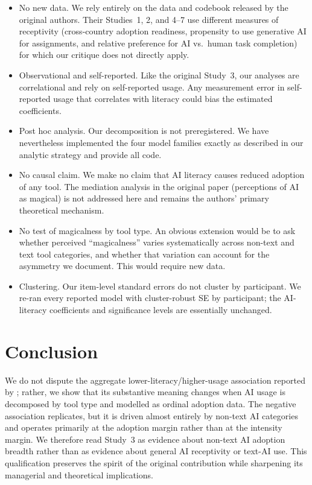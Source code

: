 \documentclass[11pt]{article}
\begin{document}
\begin{itemize}
  \item No new data. We rely entirely on the data and codebook released
    by the original authors. Their Studies~1, 2, and 4--7 use different
    measures of receptivity (cross-country adoption readiness, propensity
    to use generative AI for assignments, and relative preference for AI
    vs.\ human task completion) for which our critique does not directly
    apply.
  \item Observational and self-reported. Like the original Study~3,
    our analyses are correlational and rely on self-reported usage. Any
    measurement error in self-reported usage that correlates with literacy
    could bias the estimated coefficients.
  \item Post hoc analysis. Our decomposition is not preregistered.
    We have nevertheless implemented the four model families exactly as
    described in our analytic strategy and provide all code.
  \item No causal claim. We make no claim that AI literacy
    causes reduced adoption of any tool. The mediation analysis in
    the original paper (perceptions of AI as magical) is not addressed here
    and remains the authors' primary theoretical mechanism.
  \item No test of magicalness by tool type. An obvious extension
    would be to ask whether perceived ``magicalness'' varies systematically
    across non-text and text tool categories, and whether that variation
    can account for the asymmetry we document. This would require new data.
  \item Clustering. Our item-level standard errors do not cluster by
    participant. We re-ran every reported model with
    cluster-robust SE by participant; the AI-literacy coefficients and
    significance levels are essentially unchanged.
\end{itemize}

\section{Conclusion}

We do not dispute the aggregate lower-literacy/higher-usage association
reported by \citet{tully2025lower}; rather, we show that its substantive
meaning changes when AI usage is decomposed by tool type and modelled as
ordinal adoption data. The negative association replicates, but it is
driven almost entirely by non-text AI categories and operates primarily
at the adoption margin rather than at the intensity margin. We therefore
read Study~3 as evidence about non-text AI adoption breadth rather
than as evidence about general AI receptivity or text-AI use. This
qualification preserves the spirit of the original contribution while
sharpening its managerial and theoretical implications.
\end{document}
